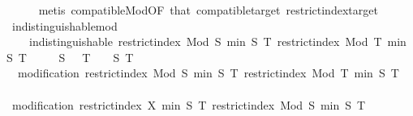 \begin{isabellebody}
\ \ \ \ \isamarkupfalse%
\ {\isacharparenleft}{\kern0pt}metis\ compatible{\isacharunderscore}{\kern0pt}Mod{\isacharbrackleft}{\kern0pt}OF\ that{\isacharbrackright}{\kern0pt}\ compatible{\isacharunderscore}{\kern0pt}target\ restrict{\isacharunderscore}{\kern0pt}index{\isacharunderscore}{\kern0pt}target{\isacharparenright}{\kern0pt}\isanewline
\ \ \isamarkupfalse%
\ indistinguishable{\isacharunderscore}{\kern0pt}mod{\isacharcolon}{\kern0pt}\ \isanewline
\ \ \ \ {\isachardoublequoteopen}indistinguishable\ {\isacharparenleft}{\kern0pt}restrict{\isacharunderscore}{\kern0pt}index\ {\isacharparenleft}{\kern0pt}Mod\ S{\isacharparenright}{\kern0pt}\ {\isacharbraceleft}{\kern0pt}{}{\isachardot}{\kern0pt}{\isachardot}{\kern0pt}min\ S\ T{\isacharbraceright}{\kern0pt}{\isacharparenright}{\kern0pt}\ {\isacharparenleft}{\kern0pt}restrict{\isacharunderscore}{\kern0pt}index\ {\isacharparenleft}{\kern0pt}Mod\ T{\isacharparenright}{\kern0pt}\ {\isacharbraceleft}{\kern0pt}{}{\isachardot}{\kern0pt}{\isachardot}{\kern0pt}min\ S\ T{\isacharbraceright}{\kern0pt}{\isacharparenright}{\kern0pt}{\isachardoublequoteclose}\isanewline
\ \ \ \ \ {\isachardoublequoteopen}S\ {\isachargreater}{\kern0pt}\ {}{\isachardoublequoteclose}\ {\isachardoublequoteopen}T\ {\isachargreater}{\kern0pt}\ {}{\isachardoublequoteclose}\ \ S\ T\isanewline
\ \ \isamarkupfalse%
\ {\isacharminus}{\kern0pt}\isanewline
\ \ \ \ \isamarkupfalse%
\ {\isacharasterisk}{\kern0pt}{\isacharcolon}{\kern0pt}\ {\isachardoublequoteopen}modification\ {\isacharparenleft}{\kern0pt}restrict{\isacharunderscore}{\kern0pt}index\ {\isacharparenleft}{\kern0pt}Mod\ S{\isacharparenright}{\kern0pt}\ {\isacharbraceleft}{\kern0pt}{}{\isachardot}{\kern0pt}{\isachardot}{\kern0pt}min\ S\ T{\isacharbraceright}{\kern0pt}{\isacharparenright}{\kern0pt}\ {\isacharparenleft}{\kern0pt}restrict{\isacharunderscore}{\kern0pt}index\ {\isacharparenleft}{\kern0pt}Mod\ T{\isacharparenright}{\kern0pt}\ {\isacharbraceleft}{\kern0pt}{}{\isachardot}{\kern0pt}{\isachardot}{\kern0pt}min\ S\ T{\isacharbraceright}{\kern0pt}{\isacharparenright}{\kern0pt}{\isachardoublequoteclose}\isanewline
\ \ \ \ \isamarkupfalse%
\ {\isacharminus}{\kern0pt}\isanewline
\ \ \ \ \ \ \isamarkupfalse%
\ {\isachardoublequoteopen}modification\ {\isacharparenleft}{\kern0pt}restrict{\isacharunderscore}{\kern0pt}index\ X\ {\isacharbraceleft}{\kern0pt}{}{\isachardot}{\kern0pt}{\isachardot}{\kern0pt}min\ S\ T{\isacharbraceright}{\kern0pt}{\isacharparenright}{\kern0pt}\ {\isacharparenleft}{\kern0pt}restrict{\isacharunderscore}{\kern0pt}index\ {\isacharparenleft}{\kern0pt}Mod\ S{\isacharparenright}{\kern0pt}\ {\isacharbraceleft}{\kern0pt}{}{\isachardot}{\kern0pt}{\isachardot}{\kern0pt}min\ S\ T{\isacharbraceright}{\kern0pt}{\isacharparenright}{\kern0pt}{\isachardoublequoteclose}\isanewline

\end{isabellebody}
